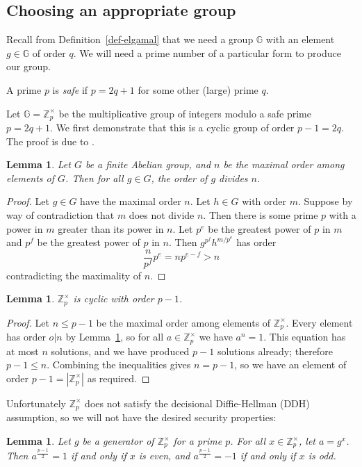 \documentclass[12pt,a4paper]{article}
\newtheorem{lemma}[theorem]{Lemma}
\theoremstyle{definition}
\begin{document}
\subsection{Choosing an appropriate group}\label{app-elgamal-group}
Recall from Definition~\ref{def-elgamal} that we need a group $\mathbb{G}$ with an element $g\in\mathbb{G}$ of order $q$. We will need a prime number of a particular form to produce our group.
\begin{definition}
    A prime $p$ is \textit{safe} if $p=2q+1$ for some other (large) prime $q$.
\end{definition}
Let $\mathbb{G}=\mathbb{Z}^\times_p$ be the multiplicative group of integers modulo a safe prime $p=2q+1$. We first demonstrate that this is a cyclic group of order $p-1=2q$. The proof is due to \cite{cyclicity}.
\begin{lemma}\label{lem-order-divides}
    Let $G$ be a finite Abelian group, and $n$ be the maximal order among elements of $G$. Then for all $g\in G$, the order of $g$ divides $n$.
\end{lemma}
\begin{proof}
    Let $g\in G$ have the maximal order $n$. Let $h\in G$ with order $m$. Suppose by way of contradiction that $m$ does not divide $n$. Then there is some prime $p$ with a power in $m$ greater than its power in $n$. Let $p^e$ be the greatest power of $p$ in $m$ and $p^f$ be the greatest power of $p$ in $n$. Then $g^{p^f}h^{m/p^e}$ has order
    $$\frac{n}{p^f}p^e=np^{e-f}>n$$
    contradicting the maximality of $n$.
\end{proof}
\begin{lemma}
    $\mathbb{Z}^\times_p$ is cyclic with order $p-1$.
\end{lemma}
\begin{proof}
    Let $n\leq p-1$ be the maximal order among elements of $\mathbb{Z}^\times_p$. Every element has order $o\vert n$ by Lemma~\ref{lem-order-divides}, so for all $a\in\mathbb{Z}^\times_p$ we have $a^n=1$. This equation has at most $n$ solutions, and we have produced $p-1$ solutions already; therefore $p-1\leq n$.
    Combining the inequalities gives $n=p-1$, so we have an element of order $p-1=|\mathbb{Z}^\times_p|$ as required.
\end{proof}
Unfortunately $\mathbb{Z}^\times_p$ does not satisfy the decisional Diffie-Hellman (DDH) assumption, so we will not have the desired security properties:
\begin{lemma}\label{lem-parity}
    Let $g$ be a generator of $\mathbb{Z}^\times_p$ for a prime $p$. For all $x\in\mathbb{Z}^\times_p$, let $a=g^x$. Then $a^{\frac{p-1}{2}} = 1$ if and only if $x$ is even, and $a^{\frac{p-1}{2}} = -1$ if and only if $x$ is odd.
\end{lemma}
\end{document}
